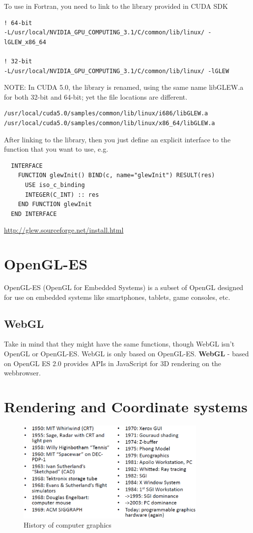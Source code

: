 To use in Fortran, you need to link to the library provided in CUDA
SDK
\begin{verbatim}
! 64-bit
-L/usr/local/NVIDIA_GPU_COMPUTING_3.1/C/common/lib/linux/ -lGLEW_x86_64

! 32-bit
-L/usr/local/NVIDIA_GPU_COMPUTING_3.1/C/common/lib/linux/ -lGLEW
\end{verbatim}
NOTE: In CUDA 5.0, the library is renamed, using the same name libGLEW.a for
both 32-bit and 64-bit; yet the file locations are different.
\begin{verbatim}
/usr/local/cuda5.0/samples/common/lib/linux/i686/libGLEW.a
/usr/local/cuda5.0/samples/common/lib/linux/x86_64/libGLEW.a
\end{verbatim}

After linking to the library, then you just define an explicit interface to the
function that you want to use, e.g.
\begin{verbatim}
  INTERFACE
    FUNCTION glewInit() BIND(c, name="glewInit") RESULT(res)
      USE iso_c_binding
      INTEGER(C_INT) :: res
    END FUNCTION glewInit
  END INTERFACE
\end{verbatim}

\url{http://glew.sourceforge.net/install.html}

\section{OpenGL-ES}
\label{sec:OpenGL-ES}

OpenGL-ES (OpenGL for Embedded Systems) is a subset of OpenGL designed for use
on embedded systems like smartphones, tablets, game consoles, etc.

\subsection{WebGL}
\label{sec:WebGL}

Take in mind that they might have the same functions, though WebGL isn't OpenGL
or OpenGL-ES. WebGL is only based on OpenGL-ES.
{\bf WebGL} - based on OpenGL ES 2.0 
provides APIs in JavaScript for 3D rendering on the webbrowser.




\section{Rendering and Coordinate systems}
\label{sec:coordinate-systems}

\begin{figure}[hbt]
  \centerline{\includegraphics[height=5cm,
    angle=0]{./images/history.eps}}
\caption{History of computer graphics }
\label{fig:history}
\end{figure}

